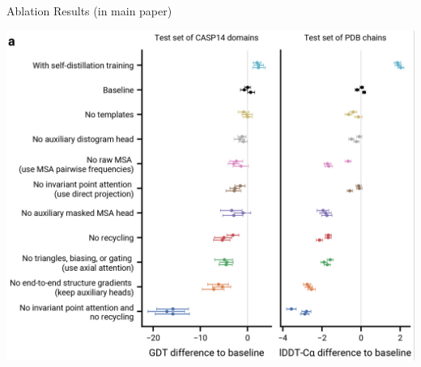 \documentclass[presentation, smaller]{beamer}
\begin{document}
\begin{frame}[label={sec:orgc60ae19}]{Ablation Results (in main paper) \cite{jumperHighlyAccurateProtein2021}}
\begin{center}
\includegraphics[height=0.9\textheight]{./imgs/ablation_results.png}
\end{center}
\end{frame}
\end{document}
